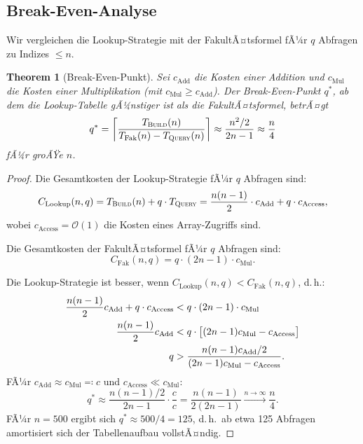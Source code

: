 ﻿\documentclass[12pt, a4paper]{article}
\newcommand{\Oh}{\mathcal{O}}
\newcommand{\build}{\textsc{Build}}
\newcommand{\query}{\textsc{Query}}
\theoremstyle{plain}
\newtheorem{theorem}{Theorem}[section]
\theoremstyle{definition}
\theoremstyle{remark}
\renewcommand{\Oh}{\mathcal{O}}
\renewcommand{\build}{\textsc{Build}}
\renewcommand{\query}{\textsc{Query}}
\begin{document}
\subsection{Break-Even-Analyse}

Wir vergleichen die Lookup-Strategie mit der FakultÃ¤tsformel fÃ¼r $q$
Abfragen zu Indizes $\le n$.

\begin{theorem}[Break-Even-Punkt]
  \label{thm:breakeven}
  Sei $c_{\text{Add}}$ die Kosten einer Addition und $c_{\text{Mul}}$
  die Kosten einer Multiplikation (mit $c_{\text{Mul}} \ge c_{\text{Add}}$).
  Der Break-Even-Punkt $q^*$, ab dem die Lookup-Tabelle gÃ¼nstiger ist
  als die FakultÃ¤tsformel, betrÃ¤gt
  \begin{equation}
    q^* = \left\lceil \frac{T_{\build}(n)}{T_{\text{Fak}}(n) - T_{\query}(n)} \right\rceil
        \approx \frac{n^2/2}{2n - 1}
        \approx \frac{n}{4}
    \label{eq:breakeven}
  \end{equation}
  fÃ¼r groÃŸe $n$.
\end{theorem}

\begin{proof}
  Die Gesamtkosten der Lookup-Strategie fÃ¼r $q$ Abfragen sind:
  \begin{equation}
    C_{\text{Lookup}}(n, q)
    = T_{\build}(n) + q \cdot T_{\query}
    = \frac{n(n-1)}{2} \cdot c_{\text{Add}} + q \cdot c_{\text{Access}},
    \label{eq:cost_lookup}
  \end{equation}
  wobei $c_{\text{Access}} = \Oh(1)$ die Kosten eines Array-Zugriffs sind.

  Die Gesamtkosten der FakultÃ¤tsformel fÃ¼r $q$ Abfragen sind:
  \begin{equation}
    C_{\text{Fak}}(n, q) = q \cdot (2n - 1) \cdot c_{\text{Mul}}.
    \label{eq:cost_fak}
  \end{equation}

  Die Lookup-Strategie ist besser, wenn
  $C_{\text{Lookup}}(n, q) < C_{\text{Fak}}(n, q)$, d.\,h.:
  \begin{align}
    \frac{n(n-1)}{2} c_{\text{Add}} + q \cdot c_{\text{Access}}
    &< q \cdot (2n-1) \cdot c_{\text{Mul}} \notag\\
    \frac{n(n-1)}{2} c_{\text{Add}}
    &< q \cdot \bigl[(2n-1) c_{\text{Mul}} - c_{\text{Access}}\bigr] \notag\\
    q &> \frac{n(n-1) c_{\text{Add}} / 2}{(2n-1) c_{\text{Mul}} - c_{\text{Access}}}.
  \end{align}
  FÃ¼r $c_{\text{Add}} \approx c_{\text{Mul}} \eqqcolon c$ und
  $c_{\text{Access}} \ll c_{\text{Mul}}$:
  \begin{equation}
    q^* \approx \frac{n(n-1)/2}{2n - 1} \cdot \frac{c}{c}
              = \frac{n(n-1)}{2(2n-1)}
              \xrightarrow{n \to \infty} \frac{n}{4}.
  \end{equation}
  FÃ¼r $n = 500$ ergibt sich $q^* \approx 500/4 = 125$, d.\,h.\ ab
  etwa 125 Abfragen amortisiert sich der Tabellenaufbau vollstÃ¤ndig.
\end{proof}
\end{document}
